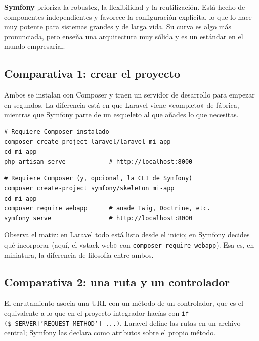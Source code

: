 \documentclass[11pt]{article}
\begin{document}
\textbf{Symfony} prioriza la robustez, la flexibilidad y la reutilización. Está hecho de componentes independientes y favorece la configuración explícita, lo que lo hace muy potente para sistemas grandes y de larga vida. Su curva es algo más pronunciada, pero enseña una arquitectura muy sólida y es un estándar en el mundo empresarial.

\subsection{Comparativa 1: crear el proyecto}
Ambos se instalan con Composer y traen un servidor de desarrollo para empezar en segundos. La diferencia está en que Laravel viene «completo» de fábrica, mientras que Symfony parte de un esqueleto al que añades lo que necesitas.

\begin{cajacodigo}
\begin{lstlisting}[style=markup]
# Requiere Composer instalado
composer create-project laravel/laravel mi-app
cd mi-app
php artisan serve            # http://localhost:8000
\end{lstlisting}
\end{cajacodigo}
\vspace{2pt}
\begin{cajacodigo}
\begin{lstlisting}[style=markup]
# Requiere Composer (y, opcional, la CLI de Symfony)
composer create-project symfony/skeleton mi-app
cd mi-app
composer require webapp      # anade Twig, Doctrine, etc.
symfony serve                # http://localhost:8000
\end{lstlisting}
\end{cajacodigo}
\vspace{2pt}
Observa el matiz: en Laravel todo está listo desde el inicio; en Symfony decides qué incorporar (aquí, el «stack web» con \texttt{composer require webapp}). Esa es, en miniatura, la diferencia de filosofía entre ambos.

\subsection{Comparativa 2: una ruta y un controlador}
El enrutamiento asocia una URL con un método de un controlador, que es el equivalente a lo que en el proyecto integrador hacías con \texttt{if (\$\_SERVER['REQUEST\_METHOD'] .\allowbreak{}.\allowbreak{}.\allowbreak{})}. Laravel define las rutas en un archivo central; Symfony las declara como atributos sobre el propio método.
\end{document}
